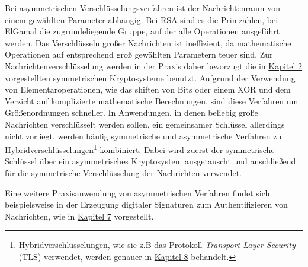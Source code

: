 Bei asymmetrischen Verschlüsselungsverfahren ist der Nachrichtenraum von einem gewählten Parameter abhängig. Bei RSA sind es die Primzahlen, bei ElGamal die zugrundeliegende Gruppe, auf der alle Operationen ausgeführt werden. Das Verschlüsseln großer Nachrichten ist ineffizient, da mathematische Operationen auf entsprechend groß gewählten Parametern teuer sind. Zur Nachrichtenverschlüsselung werden in der Praxis daher bevorzugt die in \hyperref[cha:symencryption]{Kapitel 2} vorgestellten symmetrischen Kryptosysteme benutzt. Aufgrund der Verwendung von Elementaroperationen, wie das shiften von Bits oder einem XOR und dem Verzicht auf komplizierte mathematische Berechnungen, sind diese Verfahren um Größenordnungen schneller. In Anwendungen, in denen beliebig große Nachrichten verschlüsselt werden sollen, ein gemeinsamer Schlüssel allerdings nicht vorliegt, werden häufig symmetrische und asymmetrische Verfahren zu Hybridverschlüsselungen\footnote{Hybridverschlüsselungen, wie sie z.B das Protokoll \textit{Transport Layer Security} (TLS) verwendet, werden genauer in \hyperref[cha:keyexchange]{Kapitel 8} behandelt.} kombiniert. Dabei wird zuerst der symmetrische Schlüssel über ein asymmetrisches Kryptosystem ausgetauscht und anschließend für die symmetrische Verschlüsselung der Nachrichten verwendet.

Eine weitere Praxisanwendung von asymmetrischen Verfahren findet sich beispielsweise in der Erzeugung digitaler Signaturen zum Authentifizieren von Nachrichten, wie in \hyperref[cha:asymmauth]{Kapitel 7} vorgestellt.
